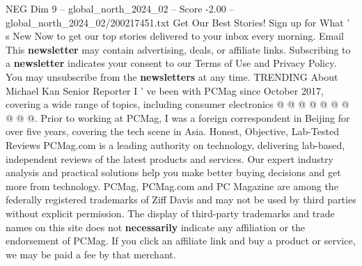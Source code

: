 \begin{textsample}{NEG Dim 9 – global\_north\_2024\_02 – Score -2.00 – global\_north\_2024\_02/200217451.txt}
Get Our Best Stories!
Sign up for What ' s New Now to get our top stories delivered to your inbox every morning.
Email This \textbf{newsletter} may contain advertising, deals, or affiliate links.
Subscribing to a \textbf{newsletter} indicates your consent to our Terms of Use and Privacy Policy.
You may unsubscribe from the \textbf{newsletters} at any time.
TRENDING About Michael Kan Senior Reporter I ' ve been with PCMag since October 2017, covering a wide range of topics, including consumer electronics @ @ @ @ @ @ @ @ @ @.
Prior to working at PCMag, I was a foreign correspondent in Beijing for over five years, covering the tech scene in Asia.
Honest, Objective, Lab-Tested Reviews PCMag.com is a leading authority on technology, delivering lab-based, independent reviews of the latest products and services.
Our expert industry analysis and practical solutions help you make better buying decisions and get more from technology.
PCMag, PCMag.com and PC Magazine are among the federally registered trademarks of Ziff Davis and may not be used by third parties without explicit permission.
The display of third-party trademarks and trade names on this site does not \textbf{necessarily} indicate any affiliation or the endorsement of PCMag.
If you click an affiliate link and buy a product or service, we may be paid a fee by that merchant.

\end{textsample}
